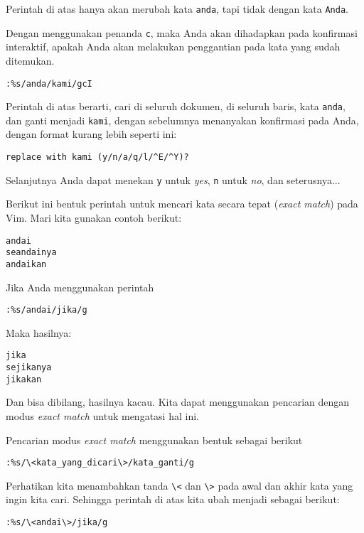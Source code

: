 \documentclass{article}
\begin{document}
Perintah di atas hanya akan merubah kata \verb=anda=, tapi
tidak dengan kata \verb=Anda=.

Dengan menggunakan penanda \verb=c=, maka Anda akan
dihadapkan pada konfirmasi interaktif, apakah Anda akan
melakukan penggantian pada kata yang sudah ditemukan.

\begin{verbatim}
:%s/anda/kami/gcI
\end{verbatim}

Perintah di atas berarti, cari di seluruh dokumen, di
seluruh baris, kata \verb=anda=, dan ganti menjadi
\verb=kami=, dengan sebelumnya menanyakan konfirmasi pada
Anda, dengan format kurang lebih seperti ini:

\begin{verbatim}
replace with kami (y/n/a/q/l/^E/^Y)?
\end{verbatim}

Selanjutnya Anda dapat menekan \verb=y= untuk \emph{yes},
\verb=n= untuk \emph{no}, dan seterusnya...

Berikut ini bentuk perintah untuk mencari kata secara tepat
(\emph{exact match}) pada Vim. Mari kita gunakan contoh
berikut:

\begin{verbatim}
andai
seandainya
andaikan
\end{verbatim}

Jika Anda menggunakan perintah

\begin{verbatim}
:%s/andai/jika/g
\end{verbatim}

Maka hasilnya:

\begin{verbatim}
jika
sejikanya
jikakan
\end{verbatim}

Dan bisa dibilang, hasilnya kacau. Kita dapat menggunakan
pencarian dengan modus \emph{exact match} untuk mengatasi
hal ini.

Pencarian modus \emph{exact match} menggunakan bentuk
sebagai berikut

\begin{verbatim}
:%s/\<kata_yang_dicari\>/kata_ganti/g
\end{verbatim}

Perhatikan kita menambahkan tanda \verb=\<= dan \verb=\>=
pada awal dan akhir kata yang ingin kita cari. Sehingga
perintah di atas kita ubah menjadi sebagai berikut:

\begin{verbatim}
:%s/\<andai\>/jika/g
\end{verbatim}
\end{document}
